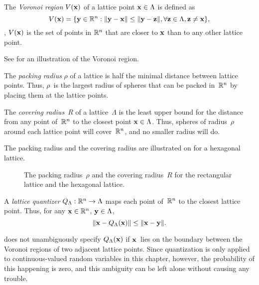 \begin{definition}
  The \emph{Voronoi region} $V(\mathbf{x})$ of a lattice point $\mathbf{x} \in \Lambda$ is
  defined as
  \begin{equation*}
    V(\mathbf{x}) = \{\mathbf{y} \in \mathbb{R}^n : \|\mathbf{y} - \mathbf{x}\| \le \|\mathbf{y} - \mathbf{z}\|, \forall \mathbf{z} \in \Lambda,
    \mathbf{z} \ne \mathbf{x} \},
  \end{equation*}
  \ie, $V(\mathbf{x})$ is the set of points in $\mathbb{R}^n$ that are closer to $\mathbf{x}$ than to
  any other lattice point.
\end{definition}
See  for an illustration of the Voronoi region.

\begin{definition}
  The \emph{packing radius} $\rho$ of a lattice is half the minimal distance
  between lattice points. Thus, $\rho$~is the largest radius of spheres that can
  be packed in~$\mathbb{R}^n$ by placing them at the lattice points.
\end{definition}

\begin{definition}
  The \emph{covering radius}~$R$ of a lattice~$\Lambda$ is the least upper
  bound for the distance from any point of~$\mathbb{R}^n$ to the closest point $\mathbf{x} \in
  \Lambda$. Thus, spheres of radius~$\rho$ around each lattice point will
  cover~$\mathbb{R}^n$, and no smaller radius will do.~\cite{ConwayS1988}
\end{definition}

The packing radius and the covering radius are illustrated on
 for a hexagonal lattice.
\begin{figure}[tbp]
  \begin{center}
    
  \end{center}
  \caption{The packing radius~$\rho$ and the covering radius~$R$ for the
  rectangular lattice and the hexagonal lattice.}
  \label{fig:packingcoveringr}
\end{figure}

\begin{definition}
  \label{def:latticequant}
  A \emph{lattice quantizer} ${Q_{\Lambda}} : \mathbb{R}^n \rightarrow \Lambda$ maps each point
  of~$\mathbb{R}^n$ to the closest lattice point. Thus, for any $\mathbf{x} \in \mathbb{R}^n$, $\mathbf{y} \in
  \Lambda$,
  \begin{equation*}
    \| \mathbf{x} - {Q_{\Lambda}}(\mathbf{x}) \| \le \|\mathbf{x} - \mathbf{y}\|.
  \end{equation*}
\end{definition}

\begin{remark}
  \label{rem:latticequant}
   does not unambiguously specify ${Q_{\Lambda}}(\mathbf{x})$ if $\mathbf{x}$~lies on
  the boundary between the Voronoi regions of two adjacent lattice points. Since
  quantization is only applied to continuous-valued random variables in this
  chapter, however, the probability of this happening is zero, and this
  ambiguity can be left alone without causing any trouble.
\end{remark}

